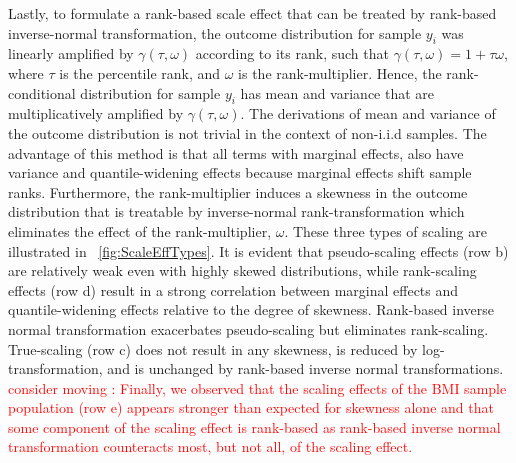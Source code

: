 \documentclass[12pt]{article}
\begin{document}
\begin{appendices}
Lastly, to formulate a rank-based scale effect that can be treated by rank-based inverse-normal transformation, the outcome distribution for sample $y_i$  was linearly amplified by $\gamma (\tau, \omega)$ according to its rank, such that $\gamma (\tau, \omega) = 1 + \tau \omega$, where $\tau$ is the percentile rank, and $\omega$ is the rank-multiplier. Hence, the rank-conditional distribution for sample $y_i$ has mean and variance that are multiplicatively amplified by $\gamma (\tau, \omega)$. The derivations of mean and variance of the outcome distribution is not trivial in the context of non-i.i.d samples. The advantage of this method is that all terms with marginal effects, also have variance and quantile-widening effects because marginal effects shift sample ranks. Furthermore, the rank-multiplier induces a skewness in the outcome distribution that is treatable by inverse-normal rank-transformation which eliminates the effect of the rank-multiplier, $\omega$.  These three types of scaling are illustrated in ~\ref{fig:ScaleEffTypes}. It is evident that pseudo-scaling effects (row b) are relatively weak even with highly skewed distributions, while rank-scaling effects (row d) result in a strong correlation between marginal effects and quantile-widening effects relative to the degree of skewness. Rank-based inverse normal transformation exacerbates pseudo-scaling but eliminates rank-scaling. True-scaling (row c) does not result in any skewness, is reduced by log-transformation, and is unchanged by rank-based inverse normal transformations. \textcolor{red}{consider moving : Finally, we observed that the scaling effects of the BMI sample population (row e) appears stronger than expected for skewness alone and that some component of the scaling effect is rank-based as rank-based inverse normal transformation counteracts most, but not all, of the scaling effect.} 


\end{appendices}
\end{document}
